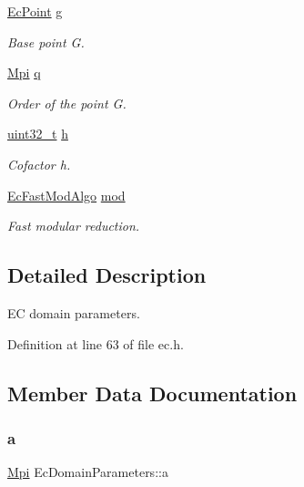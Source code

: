 \begin{DoxyCompactItemize}
\hyperlink{structEcPoint}{Ec\+Point} \hyperlink{structEcDomainParameters_a48b4ef67c6d94e7be182ae6b73708511}{g}
\begin{DoxyCompactList}\small\item\em Base point G. \end{DoxyCompactList}\item 
\hyperlink{structMpi}{Mpi} \hyperlink{structEcDomainParameters_afcdd8e7ec1aa29476df4e2ae13882a12}{q}
\begin{DoxyCompactList}\small\item\em Order of the point G. \end{DoxyCompactList}\item 
\hyperlink{stdint_8h_a435d1572bf3f880d55459d9805097f62}{uint32\+\_\+t} \hyperlink{structEcDomainParameters_a1dce92caa10cbc17456426098ff7faea}{h}
\begin{DoxyCompactList}\small\item\em Cofactor h. \end{DoxyCompactList}\item 
\hyperlink{ec__curves_8h_ab3954d019918f80a5ba98921659bbb29}{Ec\+Fast\+Mod\+Algo} \hyperlink{structEcDomainParameters_a88e9a1b0adf5894df971c30383402160}{mod}
\begin{DoxyCompactList}\small\item\em Fast modular reduction. \end{DoxyCompactList}\end{DoxyCompactItemize}


\subsection{Detailed Description}
EC domain parameters. 

Definition at line 63 of file ec.\+h.



\subsection{Member Data Documentation}
\mbox{\label{structEcDomainParameters_a108755e9eeb457a4df867816ee795589}} 
\subsubsection{\texorpdfstring{a}{a}}
{\footnotesize\ttfamily \hyperlink{structMpi}{Mpi} Ec\+Domain\+Parameters\+::a}



